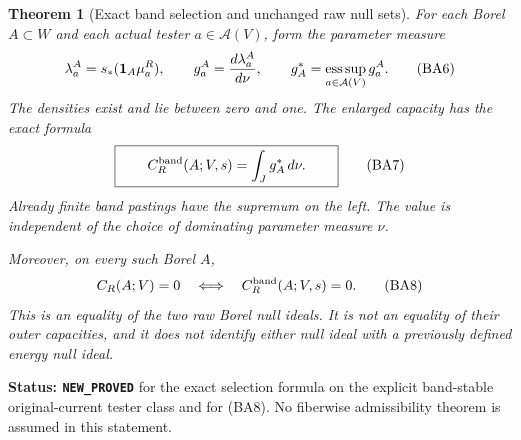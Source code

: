 \documentclass[11pt,a4paper]{article}
\numberwithin{equation}{section}
\newtheorem{theorem}{Theorem}[section]
\theoremstyle{definition}
\theoremstyle{remark}
\begin{document}
\begin{theorem}[Exact band selection and unchanged raw null sets]
\label{thm:r12-band-selection-capacity}
For each Borel $A\subset W$ and each actual tester
$a\in\mathcal A(V)$, form the parameter measure
\[
          \lambda_a^A=s_*(\mathbf1_A\mu_a^R),
          \qquad g_a^A=\frac{d\lambda_a^A}{d\nu},
          \qquad
          g_A^*=\mathop{\rm ess\,sup}_{a\in\mathcal A(V)}g_a^A.
 \tag{BA6}
\]
The densities exist and lie between zero and one. The enlarged
capacity has the exact formula
\[
 \boxed{\qquad
             C_R^{\rm band}(A;V,s)=\int_J g_A^*\,d\nu.
 \qquad}
 \tag{BA7}
\]
Already finite band pastings have the supremum on the left.
The value is independent of the choice of dominating parameter
measure $\nu$.

Moreover, on every such Borel $A$,
\[
 C_R(A;V)=0
       \quad\Longleftrightarrow\quad
 C_R^{\rm band}(A;V,s)=0.
 \tag{BA8}
\]
This is an equality of the two \emph{raw Borel null ideals}.
It is not an equality of their outer capacities, and it does
not identify either null ideal with a previously defined energy
null ideal.
\end{theorem}

\noindent\textbf{Status: \texttt{NEW\_PROVED}} for the exact
selection formula on the explicit band-stable original-current
tester class and for (BA8). No fiberwise admissibility theorem
is assumed in this statement.
\end{document}
